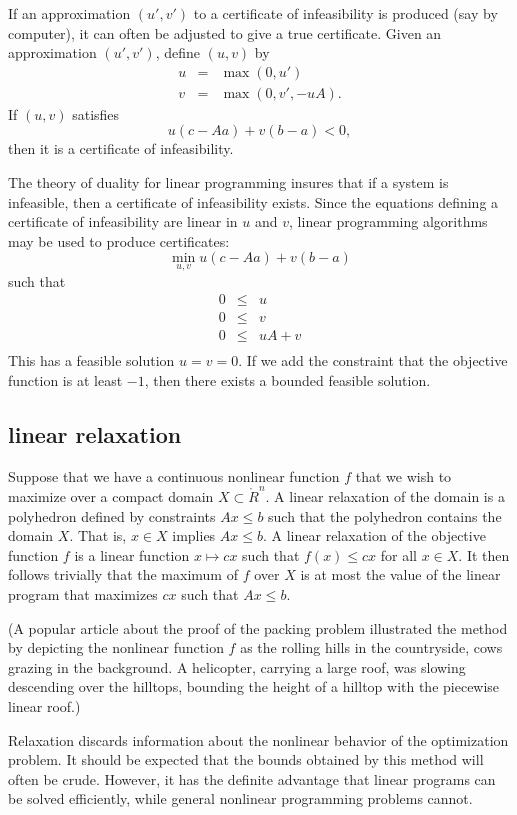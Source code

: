 If an approximation $(u',v')$ to a certificate of infeasibility is
produced (say by computer), it can often be adjusted to give a
true certificate.  Given an approximation $(u',v')$, define
$(u,v)$ by
\begin{eqnarray*}
u &=& \max(0,u')\\
v &=& \max(0,v',-u A).
\end{eqnarray*}
If $(u,v)$ satisfies
$$u( c-A a) + v(b-a) <0,$$
then it is a certificate of infeasibility.

The theory of duality for linear programming insures that if a
system is infeasible, then a certificate of infeasibility exists.
Since the equations defining a certificate of infeasibility are
linear in $u$ and $v$, linear programming algorithms may be used
to produce certificates:
\[
\min_{u,v} u (c-A a) + v(b-a)
\]
such that 
\begin{eqnarray*}
0 &\le& u\\
0 &\le& v \\
0& \le& u A + v\\
\end{eqnarray*}
This has a feasible solution $u=v=0$.  If we add the constraint
that the objective function is at least $-1$, then there exists a
bounded feasible solution.


\subsection{linear relaxation}

Suppose that we have a continuous
nonlinear function $f$ that we wish to maximize
over a compact domain $X\subset \ring{R}^n$.    A linear relaxation
of the domain is a polyhedron defined by constraints $A x \le b$
such that the polyhedron contains the domain $X$.  That is,
$x\in X$ implies $A x \le b$.    A linear relaxation of the objective
function $f$ is a linear function $x\mapsto c x$ such that
$f(x) \le c x$ for all $x\in X$.  It then follows trivially
that the maximum of $f$ over $X$ is at most the value of 
the linear program that maximizes $c x$ such that $A x \le b$.

(A popular article about the proof of the packing problem
illustrated the method by depicting the nonlinear function $f$
as the rolling hills in the countryside, cows grazing in the background.  
A helicopter,
carrying a large roof, was slowing
descending over the hilltops, bounding the height of a hilltop
with the piecewise linear roof.)

Relaxation discards information about the nonlinear behavior of the
optimization problem.  It should be expected that the bounds
obtained by this method will often be crude.  However, it has the
definite advantage that linear programs can be solved efficiently,
while general nonlinear programming problems cannot.

